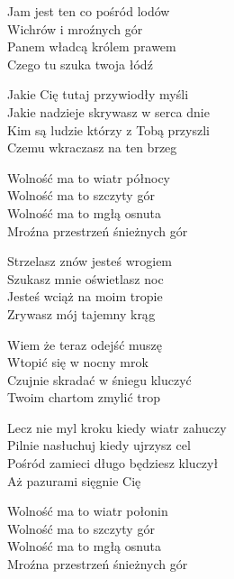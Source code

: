\begin{text}
    Jam jest ten co pośród lodów\\
    Wichrów i mroźnych gór\\
    Panem władcą królem prawem\\
    Czego tu szuka twoja łódź

    \vin Jakie Cię tutaj przywiodły myśli\\
    \vin Jakie nadzieje skrywasz w serca dnie\\
    \vin Kim są ludzie którzy z Tobą przyszli\\
    \vin Czemu wkraczasz na ten brzeg

    \vin Wolność ma to wiatr północy\\
    \vin Wolność ma to szczyty gór\\
    \vin Wolność ma to mgłą osnuta\\
    \vin Mroźna przestrzeń śnieżnych gór

    Strzelasz znów jesteś wrogiem\\
    Szukasz mnie oświetlasz noc\\
    Jesteś wciąż na moim tropie\\
    Zrywasz mój tajemny krąg

    Wiem że teraz odejść muszę\\
    Wtopić się w nocny mrok\\
    Czujnie skradać w śniegu kluczyć\\
    Twoim chartom zmylić trop

    \vin Lecz nie myl kroku kiedy wiatr zahuczy\\
    \vin Pilnie nasłuchuj kiedy ujrzysz cel\\
    \vin Pośród zamieci długo będziesz kluczył\\
    \vin Aż pazurami sięgnie Cię

    \vin Wolność ma to wiatr połonin\\
    \vin Wolność ma to szczyty gór\\
    \vin Wolność ma to mgłą osnuta\\
    \vin Mroźna przestrzeń śnieżnych gór
\end{text}
\begin{chord}

\end{chord}
